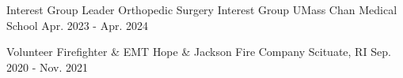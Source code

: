 
\begin{cventries}

  \cventry
  {Interest Group Leader} %
  {Orthopedic Surgery Interest Group} %
  {UMass Chan Medical School} %
  {Apr. 2023 - Apr. 2024} %
  {}

  \cventry
  {Volunteer Firefighter \& EMT} %
  {Hope \& Jackson Fire Company} %
  {Scituate, RI} %
  {Sep. 2020 - Nov. 2021} %
  {}

\end{cventries}
